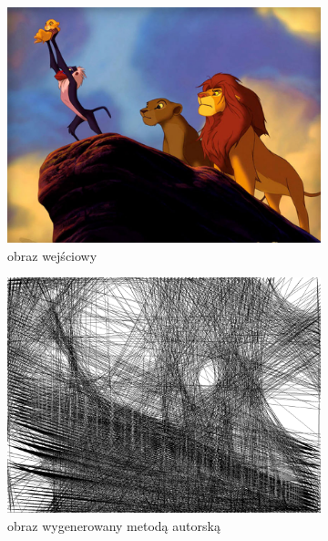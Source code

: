 \documentclass[a4paper, 12pt, polish, twoside]{extreport}
\begin{document}
	\begin{figure}[H] 
    \centering
    \begin{subfigure}{0.40\textwidth}
        \centering
        \includegraphics[width = \textwidth]{img/7-sum/simba.jpg}
        \caption{obraz wejściowy}
        \label{sum-dev-simba-a}
    \end{subfigure}
    \begin{subfigure}{0.40\textwidth}
        \centering
        \includegraphics[width = \textwidth]{img/7-sum/simba_r_i1500_c15_inv0_bg5_obj2_ed1.png}
        \caption{obraz wygenerowany metodą autorską}
        \label{sum-dev-simba-b}
    \end{subfigure}
    \begin{subfigure}{0.40\textwidth}

\end{subfigure}
\end{figure}
\end{document}
